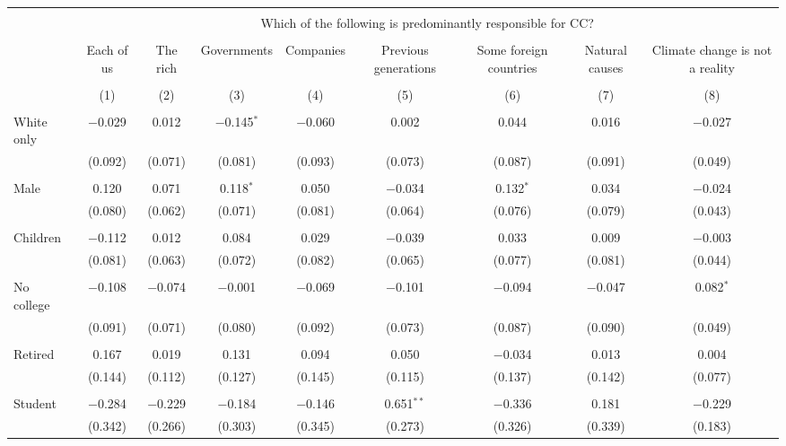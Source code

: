 
\begin{tabular}{@{\extracolsep{5pt}}lcccccccc} 
\\[-1.8ex]\hline 
\hline \\[-1.8ex] 
 & \multicolumn{8}{c}{Which of the following is predominantly responsible for CC?} \\ 
\cline{2-9} 
\\[-1.8ex] & Each of us & The rich & Governments & Companies & Previous generations & Some foreign countries & Natural causes & Climate change is not a reality \\ 
\\[-1.8ex] & (1) & (2) & (3) & (4) & (5) & (6) & (7) & (8)\\ 
\hline \\[-1.8ex] 
 White only & $-$0.029 & 0.012 & $-$0.145$^{*}$ & $-$0.060 & 0.002 & 0.044 & 0.016 & $-$0.027 \\ 
  & (0.092) & (0.071) & (0.081) & (0.093) & (0.073) & (0.087) & (0.091) & (0.049) \\ 
  & & & & & & & & \\ 
 Male & 0.120 & 0.071 & 0.118$^{*}$ & 0.050 & $-$0.034 & 0.132$^{*}$ & 0.034 & $-$0.024 \\ 
  & (0.080) & (0.062) & (0.071) & (0.081) & (0.064) & (0.076) & (0.079) & (0.043) \\ 
  & & & & & & & & \\ 
 Children & $-$0.112 & 0.012 & 0.084 & 0.029 & $-$0.039 & 0.033 & 0.009 & $-$0.003 \\ 
  & (0.081) & (0.063) & (0.072) & (0.082) & (0.065) & (0.077) & (0.081) & (0.044) \\ 
  & & & & & & & & \\ 
 No college & $-$0.108 & $-$0.074 & $-$0.001 & $-$0.069 & $-$0.101 & $-$0.094 & $-$0.047 & 0.082$^{*}$ \\ 
  & (0.091) & (0.071) & (0.080) & (0.092) & (0.073) & (0.087) & (0.090) & (0.049) \\ 
  & & & & & & & & \\ 
 Retired & 0.167 & 0.019 & 0.131 & 0.094 & 0.050 & $-$0.034 & 0.013 & 0.004 \\ 
  & (0.144) & (0.112) & (0.127) & (0.145) & (0.115) & (0.137) & (0.142) & (0.077) \\ 
  & & & & & & & & \\ 
 Student & $-$0.284 & $-$0.229 & $-$0.184 & $-$0.146 & 0.651$^{**}$ & $-$0.336 & 0.181 & $-$0.229 \\ 
  & (0.342) & (0.266) & (0.303) & (0.345) & (0.273) & (0.326) & (0.339) & (0.183) \\ 

\end{tabular}
